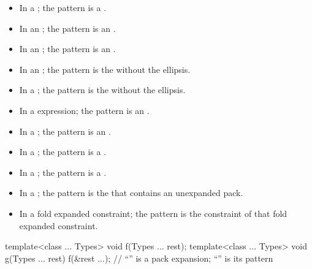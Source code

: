 \begin{itemize}
\item In a ;
the pattern is a .

\item In an ;
the pattern is an .

\item
In an ;
the pattern is an .

\item In an ; the pattern is
the  without the ellipsis.

\item In a ; the pattern is
the  without the ellipsis.

\item In a  expression; the pattern is an
.

\item In a ;
the pattern is an .

\item In a ;
the pattern is a .

\item In a ;
the pattern is a .

\item In a ;
the pattern is the 
that contains an unexpanded pack.

\item In a fold expanded constraint;
the pattern is the constraint of that fold expanded constraint.
\end{itemize}

\begin{example}
\begin{codeblock}
template<class ... Types> void f(Types ... rest);
template<class ... Types> void g(Types ... rest) {
  f(&rest ...);     // ``'' is a pack expansion; ``'' is its pattern
}
\end{codeblock}
\end{example}

